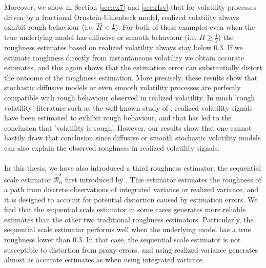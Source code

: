 \documentclass{article}
\begin{document}
Moreover, we show in Section \ref{sec:ex7} and \ref{sec:rfsv} that for volatility processes driven by a fractional Ornstein-Uhlenbeck model, realized volatility always exhibit rough behaviour (i.e. $\widehat{H}<\frac{1}{2}$). For both of these examples even when the true underlying model has diffusive or smooth behaviour (i.e. $H\geq \frac{1}{2}$) the roughness estimates based on realized volatility always stay below $0.3$. If we estimate roughness directly from instantaneous volatility we obtain accurate estimates, and this again shows that the estimation error can substantially distort the outcome of the roughness estimation. More precisely, these results show that stochastic diffusive models or even smooth volatility processes are perfectly compatible with rough behaviour observed in realized volatility. In much 'rough volatility' literature such as the well-known study of \cite{gatheral}, realized volatility signals have been estimated to exhibit rough behaviour, and that has led to the conclusion that 'volatility is rough'. However, our results show that one cannot hastily draw that conclusion since diffusive or smooth stochastic volatility models can also explain the  observed roughness in realized volatility signals. \\\\
In this thesis, we have also introduced a third roughness estimator, the sequential scale estimator $\widehat{\mathscr{R}}_n^s$ first introduced by \cite{han}. This estimator estimates the roughness of a path from discrete observations of integrated variance or realized variance, and it is designed to account for potential distortion caused by estimation errors. We find that the sequential scale estimator in some cases generates more reliable estimates than the other two traditional roughness estimators. Particularly, the sequential scale estimator performs well when the underlying model has a true roughness lower than 0.3. In that case, the sequential scale estimator is not susceptible to distortion from proxy errors, and using realized variance generates almost as accurate estimates as when using integrated variance.\\
\end{document}

